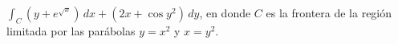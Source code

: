 \item $\int_C (y + e^{\sqrt{x}}) \, dx + (2x + \cos y^2) \, dy$, en donde $C$ es la frontera de la región limitada por las parábolas $y = x^2$ y $x = y^2$.
